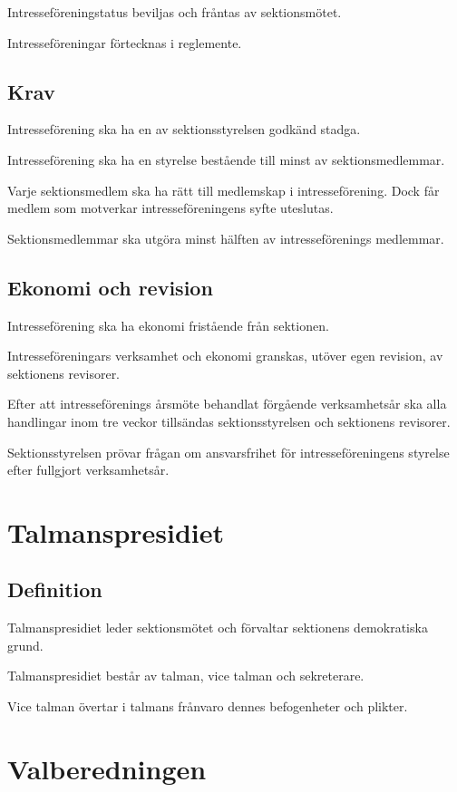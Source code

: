 \documentclass{styrdokument}
\begin{document}
\? Intresseföreningstatus beviljas och fråntas av sektionsmötet.

\? Intresseföreningar förtecknas i reglemente.

\subsection{Krav}

\? Intresseförening ska ha en av sektionsstyrelsen godkänd stadga.

\? Intresseförening ska ha en styrelse bestående till minst  av sektionsmedlemmar.

\? Varje sektionsmedlem ska ha rätt till medlemskap i intresseförening.
Dock får medlem som motverkar intresseföreningens syfte uteslutas.
\label{ratt.intressef}

\? Sektionsmedlemmar ska utgöra minst hälften av intresseförenings medlemmar.

\subsection{Ekonomi och revision}

\? Intresseförening ska ha ekonomi fristående från sektionen.

\? Intresseföreningars verksamhet och ekonomi granskas, utöver egen revision, av sektionens revisorer.

\? Efter att intresseförenings årsmöte behandlat förgående verksamhetsår ska alla handlingar inom tre veckor tillsändas sektionsstyrelsen och sektionens revisorer.

\? Sektionsstyrelsen prövar frågan om ansvarsfrihet för intresseföreningens styrelse efter fullgjort verksamhetsår.

\section{Talmanspresidiet}
\subsection{Definition}

\? Talmanspresidiet leder sektionsmötet och förvaltar sektionens demokratiska
grund.

\? Talmanspresidiet består av talman, vice talman och sekreterare.

\? Vice talman övertar i talmans frånvaro dennes befogenheter och plikter.

\section{Valberedningen}
\end{document}
